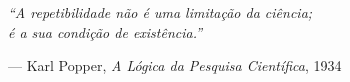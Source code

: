 \vspace*{\fill}
\begin{flushright}
\begin{minipage}{0.6\textwidth}
\small\itshape
``A repetibilidade não é uma limitação da ciência;\\
é a sua condição de existência.''

\vspace{0.3cm}
--- Karl Popper, \textit{A Lógica da Pesquisa Científica}, 1934
\end{minipage}
\end{flushright}
